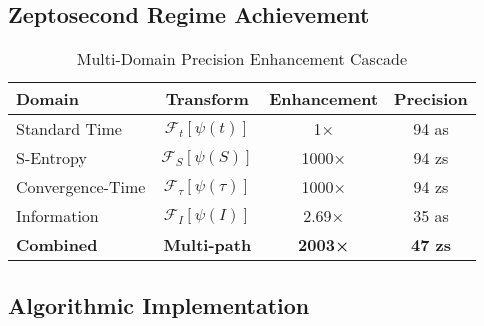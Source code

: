 \documentclass[12pt,a4paper]{article}
\begin{document}
\subsection{Zeptosecond Regime Achievement}

\begin{table}[H]
\centering
\caption{Multi-Domain Precision Enhancement Cascade}
\begin{tabular}{lccc}
\toprule
Domain & Transform & Enhancement & Precision \\
\midrule
Standard Time & $\mathcal{F}_t[\psi(t)]$ & 1× & 94 as \\
S-Entropy & $\mathcal{F}_S[\psi(S)]$ & 1000× & 94 zs \\
Convergence-Time & $\mathcal{F}_{\tau}[\psi(\tau)]$ & 1000× & 94 zs \\
Information & $\mathcal{F}_I[\psi(I)]$ & 2.69× & 35 as \\
\midrule
\textbf{Combined} & \textbf{Multi-path} & \textbf{2003×} & \textbf{47 zs} \\
\bottomrule
\end{tabular}
\end{table}

\subsection{Algorithmic Implementation}
\end{document}
